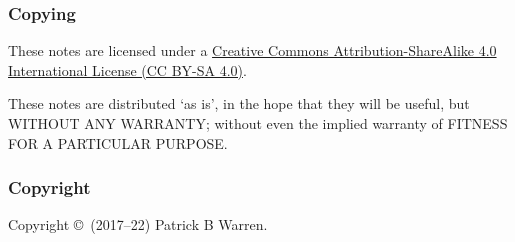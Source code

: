 \documentclass[]{article}
\begin{document}
\subsubsection{Copying}\label{copying}

These notes are licensed under a
\href{https://creativecommons.org/licenses/by-sa/4.0/}{Creative
  Commons Attribution-ShareAlike 4.0 International License (CC BY-SA
  4.0)}.

These notes are distributed `as is', in the hope that they will be useful, but
WITHOUT ANY WARRANTY; without even the implied warranty of
FITNESS FOR A PARTICULAR PURPOSE.

\subsubsection{Copyright}\label{copyright}

Copyright \copyright\ (2017--22) Patrick B Warren.
\end{document}
